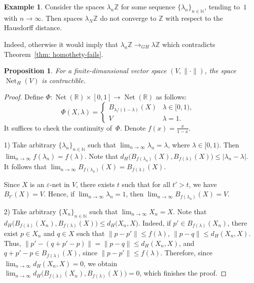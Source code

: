 \documentclass{article}
\newtheorem{proposition}{Proposition}[]
\theoremstyle{definition}
\newtheorem{example}{Example}[]
\theoremstyle{plain}
\renewcommand{\:}{\colon}
\newcommand{\0}{\emptyset}
\renewcommand{\(}{\rom(}
\renewcommand{\)}{\rom)}
\newcommand{\N}{\mathbb{N}}
\newcommand{\R}{\mathbb{R}}
\newcommand{\Z}{\mathbb{Z}}
\newcommand{\nets}{\operatorname{Net}}
\begin{document}
\begin{example}
Consider the spaces $\lambda_n\Z$ for some sequence $\{\lambda_n\}_{n\in\N}$, tending to~$1$ with $n\rightarrow\infty$. Then spaces $\lambda_N\Z$ do not converge to $\Z$ with respect to the Hausdorff distance. 

Indeed, otherwise it would imply that $\lambda_n\Z\rightarrow_{GH}\lambda\Z$ which contradicts Theorem~\ref{thm: homothety-fails}.
\end{example}

\begin{proposition}
For a finite-dimansional vector space $(V, \|\cdot\|)$, the space $\nets_H(V)$ is contractible. 
\end{proposition}

\begin{proof}
Define $\Phi\: \nets(\R)\times [0, 1]\to \nets(\R)$ as follows: $$\Phi(X, \lambda) = \begin{cases}B_{\lambda/(1-\lambda)}(X) & \lambda\in[0, 1),\\ V &\lambda = 1.\end{cases}$$ 
It suffices to check the continuity of~$\Phi$. Denote $f(x) = \frac{x}{1-x}$.

1) Take arbitrary $\{\lambda_n\}_{n\in\N}$ such that $\displaystyle \lim_{n\to\infty}\lambda_n = \lambda$, where $\lambda\in[0, 1)$. Then $\displaystyle \lim_{n\to\infty}f(\lambda_n) = f(\lambda)$. Note that $d_H\bigl(B_{f(\lambda_n)}(X), B_{f(\lambda)}(X)\bigr)\le |\lambda_n-\lambda|.$ It follows that $\displaystyle \lim_{n\to\infty} B_{f(\lambda_n)}(X) = B_{f(\lambda)}(X)$.

Since $X$ is an $\varepsilon$-net in $V$, there exists $t$ such that for all $t' > t$, we have $B_{t'}(X) = V$. Hence, if $\displaystyle\lim_{n\to\infty}\lambda_n = 1$, then $\displaystyle \lim_{n\to\infty} B_{f(\lambda_n)}(X) = V$.

2) Take arbitrary $\{X_n\}_{n\in\N}$ such that $\displaystyle \lim_{n\to\infty}X_n = X$. Note that $d_H\bigl(B_{f(\lambda)}(X_n), B_{f(\lambda)}(X)\bigr)\le d_H\bigl(X_n, X)$. Indeed, if $p'\in B_{f(\lambda)}(X_n)$, there exist $p\in X_n$ and $q\in X$ such that $\|p-p'\|\le f(\lambda)$, $\|p-q\|\le d_H(X_n, X)$. Thus, $\|p' - (q + p' - p)\| = \|p-q\|\le d_H(X_n, X)$, and $q + p' - p\in B_{f(\lambda)}(X)$, since $\|p-p'\|\le f(\lambda)$. Therefore, since $\displaystyle \lim_{n\to\infty} d_H(X_n, X) = 0$, we obtain $\displaystyle \lim_{n\to\infty} d_H\bigl(B_{f(\lambda)}(X_n), B_{f(\lambda)}(X)\bigr) = 0$, which finishes the proof.
\end{proof}
\end{document}
